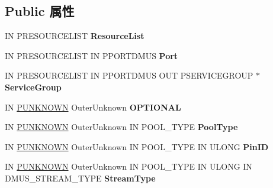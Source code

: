 \subsection*{Public 属性}
\begin{DoxyCompactItemize}
\item 
\mbox{\label{class_c_miniport_d_mus_u_a_r_t_ab6783da17b31778d6462ebf8af7d5f6c}} 
IN P\+R\+E\+S\+O\+U\+R\+C\+E\+L\+I\+ST {\bfseries Resource\+List}
\item 
\mbox{\label{class_c_miniport_d_mus_u_a_r_t_a32db10054c707f990e3d02c6c7554ddd}} 
IN P\+R\+E\+S\+O\+U\+R\+C\+E\+L\+I\+ST IN P\+P\+O\+R\+T\+D\+M\+US {\bfseries Port}
\item 
\mbox{\label{class_c_miniport_d_mus_u_a_r_t_a9a572ed3f5deeb28dd0eaccee37f1dfe}} 
IN P\+R\+E\+S\+O\+U\+R\+C\+E\+L\+I\+ST IN P\+P\+O\+R\+T\+D\+M\+US O\+UT P\+S\+E\+R\+V\+I\+C\+E\+G\+R\+O\+UP $\ast$ {\bfseries Service\+Group}
\item 
\mbox{\label{class_c_miniport_d_mus_u_a_r_t_ab3d779d020f2f35cd59adb77dc7721f5}} 
IN \hyperlink{interface_i_unknown}{P\+U\+N\+K\+N\+O\+WN} Outer\+Unknown {\bfseries O\+P\+T\+I\+O\+N\+AL}
\item 
\mbox{\label{class_c_miniport_d_mus_u_a_r_t_a281a426f3d8e248f6819a7ec7a27c8e3}} 
IN \hyperlink{interface_i_unknown}{P\+U\+N\+K\+N\+O\+WN} Outer\+Unknown IN P\+O\+O\+L\+\_\+\+T\+Y\+PE {\bfseries Pool\+Type}
\item 
\mbox{\label{class_c_miniport_d_mus_u_a_r_t_aaf392239e8387bcc5914561f95940ef2}} 
IN \hyperlink{interface_i_unknown}{P\+U\+N\+K\+N\+O\+WN} Outer\+Unknown IN P\+O\+O\+L\+\_\+\+T\+Y\+PE IN U\+L\+O\+NG {\bfseries Pin\+ID}
\item 
\mbox{\label{class_c_miniport_d_mus_u_a_r_t_a142bd66d37ac5fb6e047cf49a13fa55f}} 
IN \hyperlink{interface_i_unknown}{P\+U\+N\+K\+N\+O\+WN} Outer\+Unknown IN P\+O\+O\+L\+\_\+\+T\+Y\+PE IN U\+L\+O\+NG IN D\+M\+U\+S\+\_\+\+S\+T\+R\+E\+A\+M\+\_\+\+T\+Y\+PE {\bfseries Stream\+Type}
\item 
\mbox{\label{class_c_miniport_d_mus_u_a_r_t_a5ab2b5f659916e4d1fe68d79a3749fb4}} 

\end{DoxyCompactItemize}
